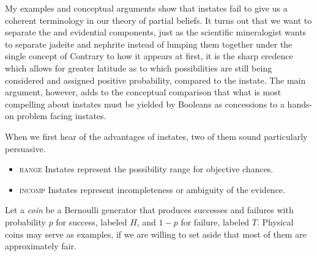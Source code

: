\documentclass[11pt]{article}
\begin{document}
My examples and conceptual arguments show that instates fail to give
us a coherent terminology in our theory of partial beliefs. It turns
out that we want to separate the {\doxnotep} and evidential
components, just as the scientific mineralogist wants to separate
jadeite and nephrite instead of lumping them together under the single
concept of  Contrary to how it appears at first, it
is the sharp credence which allows for greater latitude as to which
possibilities are still being considered and assigned positive
probability, compared to the instate. The main argument, however, adds
to the conceptual comparison that what is most compelling about
instates must be yielded by Booleans as concessions to a hands-on
problem facing instates.

When we first hear of the advantages of instates, two of them sound
particularly persuasive.

\begin{itemize}
\item \textsc{range} Instates represent the possibility range for objective
  chances.
\item \textsc{incomp} Instates represent incompleteness or ambiguity of the
  evidence.
\end{itemize}

Let a \textit{coin} be a Bernoulli generator that produces successes
and failures with probability $p$ for success, labeled $H$, and $1-p$
for failure, labeled $T$. Physical coins may serve as examples, if we
are willing to set aside that most of them are approximately fair.

\addtocounter{expls}{1}

\end{document}
